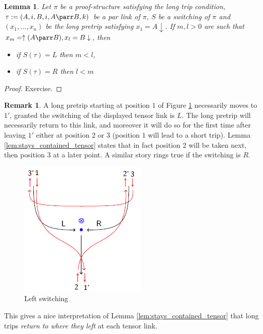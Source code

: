 \documentclass[12pt]{article}
\theoremstyle{plain}
\newtheorem{lemma}[thm]{Lemma}
\theoremstyle{definition}
\newtheorem{remark}[thm]{Remark}
\begin{document}
\begin{lemma}\label{lem:stays_contained_par}
Let $\pi$ be a proof-structure satisfying the long trip condition, $\tau := (A,i,B,i,A\parr B, k)$ be a par link of $\pi$, $S$ be a switching of $\pi$ and $(x_1,...,x_n)$ be the long pretrip satisfying $x_1 = A\downarrow$. If $m,l > 0$ are such that $x_m = \uparrow (A \parr B), x_l = B\downarrow$, then
\begin{itemize}
    \item if $S(\tau) = L$ then $m < l$,
    \item if $S(\tau) = R$ then $l < m$
\end{itemize}
\end{lemma}
\begin{proof}
Exercise.
\end{proof}
\begin{remark}
A long pretrip starting at position $1$ of Figure \ref{fig:stays_contained_explained_tens} necessarily moves to $1'$, granted the switching of the displayed tensor link is $L$. The long pretrip will necessarily return to this link, and moreover it will do so for the first time after leaving $1'$ either at position $2$ or $3$ (position $1$ will lead to a short trip). Lemma \ref{lem:stays_contained_tensor} states that in fact position $2$ will be taken next, then position $3$ at a later point. A similar story rings true if the switching is $R$.
\begin{figure}[h]
    \centering
    \includegraphics{TensorLeftSwitching.png}
    \caption{Left switching}
    \label{fig:stays_contained_explained_tens}
\end{figure}
This gives a nice interpretation of Lemma \ref{lem:stays_contained_tensor} that long trips \emph{return to where they left} at each tensor link.


\end{remark}
\end{document}

